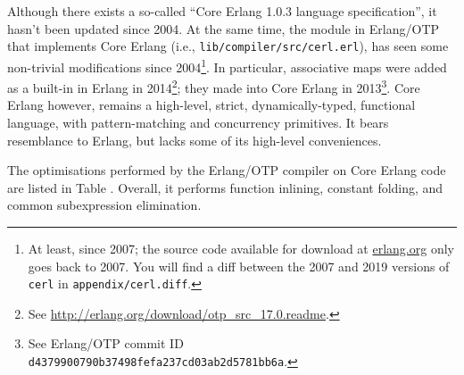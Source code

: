 Although there exists a so-called ``Core Erlang 1.0.3 language
specification''\cite{erlang:2004:core-spec}, it hasn't been updated
since 2004. At the same time, the module in Erlang/OTP that implements
Core Erlang (i.e., \texttt{lib/compiler/src/cerl.erl}), has seen some
non-trivial modifications since 2004\footnote{At least, since 2007;
the source code available for download at \url{erlang.org} only goes
back to 2007. You will find a diff between the 2007 and 2019 versions
of \texttt{cerl} in \texttt{appendix/cerl.diff}.}. In particular,
associative maps were added as a built-in in Erlang in
2014\footnote{See
\url{http://erlang.org/download/otp_src_17.0.readme}.}; they made into
Core Erlang in 2013\footnote{See Erlang/OTP commit ID
\texttt{d4379900790b37498fefa237cd03ab2d5781bb6a}.}. Core Erlang
however, remains a high-level, strict, dynamically-typed, functional
language, with pattern-matching and concurrency primitives.  It bears
resemblance to Erlang, but lacks some of its high-level conveniences.

The optimisations performed by the Erlang/OTP compiler on Core Erlang
code are listed in Table .
Overall, it performs function inlining, constant folding, and common
subexpression elimination.


